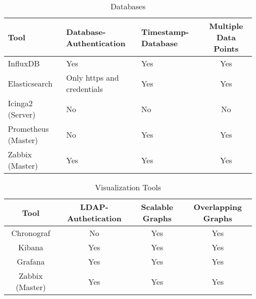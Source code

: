 \begin{table}
\centering

\label{tab:database}
\begin{tabular}{p{3cm}p{3cm}p{3cm}c}
	\hline
Tool & Database-Authentication     & Timestamp-Database          & Multiple Data Points        \\
\hline
InfluxDB                     & Yes & Yes                         & Yes                         \\
Elasticsearch                & Only https and credentials  & Yes & Yes                         \\
Icinga2 (Server)             & No                          & No                          & No                          \\
Prometheus (Master)          & No                          & Yes & Yes                         \\
Zabbix (Master)              & Yes                         & Yes                         & Yes\\
\hline
\end{tabular}
\caption{Databases}
\end{table}

\begin{table}
\centering

\label{tab:visualization}
\begin{tabular}{cccc}
	\hline
Tool & LDAP-Authetication         & Scalable Graphs             & Overlapping Graphs          \\
\hline
Chronograf                   & No & Yes                         & Yes                         \\
Kibana                       & Yes                        & Yes & Yes                         \\
Grafana                      & Yes                        & Yes & Yes                         \\
Zabbix (Master)              & Yes                        & Yes                         & Yes\\
\hline
\end{tabular}
\caption{Visualization Tools}
\end{table}

